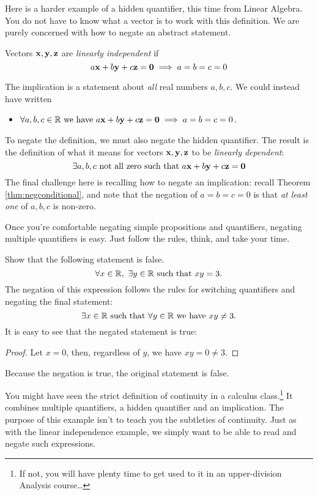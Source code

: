 Here is a harder example of a hidden quantifier, this time from Linear Algebra. You do not have to know what a vector is to work with this definition. We are purely concerned with how to negate an abstract statement.

\begin{defn}{}{}
Vectors ${\mathbf{x}},{\mathbf{y}},{\mathbf{z}}$ are \emph{linearly independent} if
\[a{\mathbf{x}}+b{\mathbf{y}}+c{\mathbf{z}}=\mathbf{0}\implies a=b=c=0\]
\end{defn}
The implication is a statement about \emph{all} real numbers $a,b,c$. We could instead have written
  \begin{itemize}\setlength{\itemsep}{0pt}
    \item[] $\forall a,b,c\in\mathbb{R}\text{ we have }a{\mathbf{x}}+b{\mathbf{y}}+c{\mathbf{z}}=\mathbf{0}\implies a=b=c=0$.
  \end{itemize}
  To negate the definition, we must also negate the hidden quantifier. The result is the definition of what it means for vectors ${\mathbf{x}},{\mathbf{y}},{\mathbf{z}}$ to be \emph{linearly dependent}:
    \[\exists a,b,c\text{ not all zero such that }a{\mathbf{x}}+b{\mathbf{y}}+c{\mathbf{z}}=\mathbf{0}\]
The final challenge here is recalling how to negate an implication: recall Theorem \ref{thm:negconditional}, and note that the negation of $a=b=c=0$ is that \emph{at least one} of $a,b,c$ is non-zero.


Once you're comfortable negating simple propositions and quantifiers, negating multiple quantifiers is easy. Just follow the rules, think, and take your time.

\begin{example}{}{}
Show that the following statement is false.
\[\forall x\in\mathbb{R},\ \exists y\in\mathbb{R}\text{ such that }xy=3.\]
The negation of this expression follows the rules for switching quantifiers and negating the final statement:
\[\exists x\in\mathbb{R}\text{ such that }\forall y\in\mathbb{R}\text{ we have }xy\neq 3.\]
It is easy to see that the negated statement is true:
\begin{proof}
Let $x=0$, then, regardless of $y$, we have $xy=0\neq 3$.
\end{proof}

 Because the negation is true, the original statement is false.
\end{example}



You might have seen the strict definition of continuity in a calculus class.\footnote{If not, you will have plenty time to get used to it in an upper-division Analysis course\ldots} It combines multiple quantifiers, a hidden quantifier and an implication. The purpose of this example isn't to teach you the subtleties of continuity. Just as with the linear independence example, we simply want to be able to read and negate such expressions.

